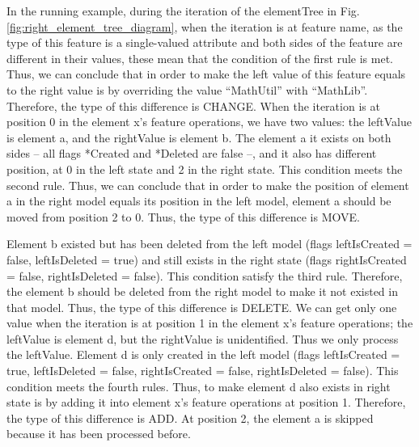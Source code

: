 \documentclass{jot}
\begin{document}
In the running example, during the iteration of the \textsf{elementTree} in Fig. \ref{fig:right_element_tree_diagram}, when the iteration is at feature \textsf{name}, as the type of this feature is a single-valued attribute and both sides of the feature are different in their values, these mean that the condition of the first rule is met. Thus, we can conclude that in order to make the left value of this feature equals to the right value is by overriding the value ``MathUtil'' with ``MathLib''. Therefore, the type of this difference is \textsf{CHANGE}. When the iteration is at position 0 in the element \textsf{x}'s feature \textsf{operations}, we have two values: the \textsf{leftValue} is element \textsf{a}, and the \textsf{rightValue} is element \textsf{b}. The element \textsf{a} it exists on both sides -- all flags \textsf{*Created} and \textsf{*Deleted} are false --, and it also has different position, at 0 in the left state and 2 in the right state. This condition meets the second rule. Thus, we can conclude that in order to make the position of element \textsf{a} in the right model equals its position in the left model, element \textsf{a} should be moved from position 2 to 0. Thus, the type of this difference is \textsf{MOVE}. 

Element \textsf{b} existed but has been deleted from the left model (flags \textsf{leftIsCreated} = false, \textsf{leftIsDeleted} = true) and still exists in the right state (flags \textsf{rightIsCreated} = false, \textsf{rightIsDeleted} = false). This condition satisfy the third rule. Therefore, the element \textsf{b} should be deleted from the right model to make it not existed in that model. Thus, the type of this difference is \textsf{DELETE}. We can get only one value when the iteration is at position 1 in the element \textsf{x}'s feature \textsf{operations}; the \textsf{leftValue} is element \textsf{d}, but the \textsf{rightValue} is unidentified. Thus we only process the \textsf{leftValue}. Element \textsf{d} is only created in the left model (flags \textsf{leftIsCreated} = true, \textsf{leftIsDeleted} = false, \textsf{rightIsCreated} = false, \textsf{rightIsDeleted} = false). This condition meets the fourth rules. Thus, to make element \textsf{d} also exists in right state is by adding it into element \textsf{x}'s feature \textsf{operations} at position 1. Therefore, the type of this difference is \textsf{ADD}. At position 2, the element \textsf{a} is skipped because it has been processed before. 
\end{document}
